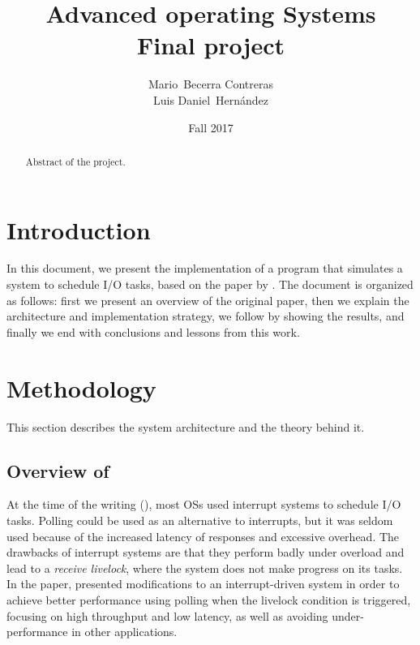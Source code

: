 \documentclass{article}
\begin{document}

\title{Advanced operating Systems \\ Final project}

\author{Mario~Becerra Contreras \\ Luis Daniel~Hernández}

\date{Fall 2017}


\maketitle

\begin{abstract}

Abstract of the project.

\end{abstract}

\section{Introduction}

In this document, we present the implementation of a program that simulates a system to schedule I/O tasks, based on the \citeyear{mogul1997eliminating} paper  by \citeauthor{mogul1997eliminating} \cite{mogul1997eliminating}. The document is organized as follows: first we present an overview of the original paper, then we explain the architecture and implementation strategy, we follow by showing the results, and finally we end with conclusions and lessons from this work.


\section{Methodology}

This section describes the system architecture and the theory behind it.

\subsection{Overview of }

At the time of the writing (\citeyear{mogul1997eliminating}), most OSs used interrupt systems to schedule I/O tasks. Polling could be used as an alternative to interrupts, but it was seldom used because of the increased latency of responses and excessive overhead. The drawbacks of interrupt systems are that they perform badly under overload and lead to a \textit{receive livelock}, where the system does not make progress on its tasks. In the paper, \citeauthor{mogul1997eliminating} presented modifications to an interrupt-driven system in order to achieve better performance using polling when the livelock condition is triggered, focusing on high throughput and low latency, as well as avoiding under-performance in other applications.
\end{document}
